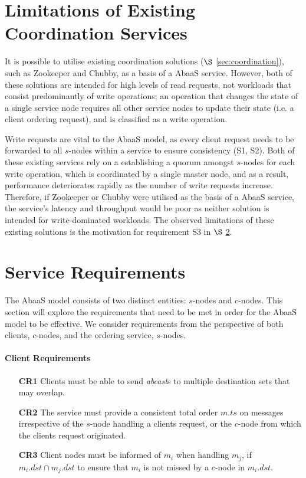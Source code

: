 \section{Limitations of Existing Coordination Services}\label{sec:limitations_existing_coordination}
It is possible to utilise existing coordination solutions ($\S$ \ref{sec:coordination}), such as Zookeeper\citep{Hunt:2010:ZWC:1855840.1855851} and Chubby\citep{Burrows:2006:CLS:1298455.1298487}, as a basis of a \textsf{AbaaS} service.  However, both of these solutions are intended for high levels of read requests, not workloads that consist predominantly of write operations; an operation that changes the state of a single service node requires all other service nodes to update their state (i.e. a client ordering request), and is classified as a write operation.  

Write requests are vital to the \textsf{AbaaS} model, as every client request needs to be forwarded to all $s$-nodes within a service to ensure consistency (S1, S2).  Both of these existing services rely on a establishing a quorum amongst $s$-nodes for each write operation, which is coordinated by a single master node, and as a result, performance deteriorates rapidly as the number of write requests increase.  Therefore, if Zookeeper or Chubby were utilised as the basis of a \textsf{AbaaS} service, the service's latency and throughput would be poor as neither solution is intended for write-dominated workloads.  The observed limitations of these existing solutions is the motivation for requirement S3 in $\S$ \ref{sec:absaas_requirements}.  	
	
\section{Service Requirements}\label{sec:absaas_requirements}
The \textsf{AbaaS} model consists of two distinct entities: $s$-nodes and $c$-nodes.  This section will explore the requirements that need to be met in order for the \textsf{AbaaS} model to be effective.  We consider requirements from the perspective of both clients, $c$-nodes, and the ordering service, $s$-nodes.

	\paragraph{Client Requirements} \hspace{0pt}
	\begin{itemize}
		\item [\textbf{CR1}] Clients must be able to send \emph{abcast}s to multiple destination sets that may overlap.
		
		\item [\textbf{CR2}] The service must provide a consistent total order $m.ts$ on messages irrespective of the $s$-node handling a clients request, or the $c$-node from which the clients request originated.  
		
		\item [\textbf{CR3}] Client nodes must be informed of $m_i$ when handling $m_j$, if $m_i.dst \cap m_j.dst$ to ensure that $m_i$ is not missed by a $c$-node in $m_i.dst$.  
	\end{itemize}
	
